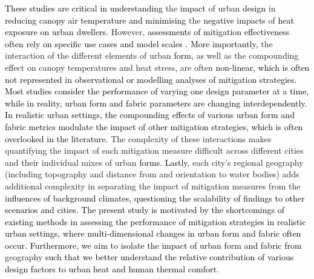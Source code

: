 \documentclass[final,3p,times,authoryear]{elsarticle}
\newcommand{\add}[1]{\textcolor{black}{#1}}
\newcommand{\remove}[1]{\textcolor{red}{\st{}}}
\begin{document}
\remove{In a review of}\add{These studies are critical in understanding} the \remove{influence}\add{impact} of \remove{cities on local meteorology, found that}urban \remove{climates and heat stress}\add{design} in \remove{cities are influenced by four main factors, 1) the built form, 2) the natural and vegetated form (i.e. soil, water, vegetation and their phenology), 3)}\add{reducing canopy air temperature}\remove{urban functions (heat released by human activities), and 4) regional geographic settings. As noted above, (1) and (2) are often} \add{and minimising} the \remove{focus}\add{negative impacts} of \remove{mitigation strategies.}\add{heat exposure on urban dwellers.} However, \add{assessments of mitigation effectiveness often rely on specific use cases and model scales \citep{Krayenhoff2021}. More importantly,} the interaction of the different elements of urban \remove{form}\add{form,} as well as the compounding effect on canopy temperatures and heat stress, are often \add{non-linear, which is often not represented in observational or modelling analyses of mitigation strategies. Most studies consider the performance of varying one design parameter at a time, while in reality, urban form and fabric parameters are changing interdependently. In realistic urban settings, the compounding effects of various urban form and fabric metrics modulate the impact of other mitigation strategies, which is often overlooked in the literature.} The complexity of these interactions makes quantifying the impact of each mitigation measure difficult across different cities and their individual mixes of urban \remove{form. Additionally,}\add{forms. Lastly,} each city's regional geography (including topography and distance from and orientation to water bodies) adds additional complexity in separating the impact of mitigation measures from the \add{influences of background climates, questioning the scalability of findings to other scenarios and cities. The present study is motivated by the shortcomings of existing methods in assessing the performance of mitigation strategies in realistic urban settings, where multi-dimensional changes in urban form and fabric often occur. Furthermore, we aim to isolate the impact of urban form and fabric from} geography \remove{influence.}\add{such that we better understand the relative contribution of various design factors to urban heat and human thermal comfort.}  
\end{document}
